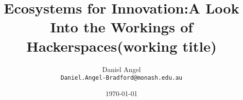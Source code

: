 \documentclass[a4paper,11pt,notitlepage]{article}
\title{Ecosystems for Innovation:\newline{}A Look Into the Workings of Hackerspaces\newline{}\small{(working title)}}
\author{Daniel Angel\\\texttt{Daniel.Angel-Bradford@monash.edu.au}}
\date{\today} %
\begin{document}
\maketitle

\tableofcontents
\listoffigures


\newpage











%

%




\small




\end{document}
